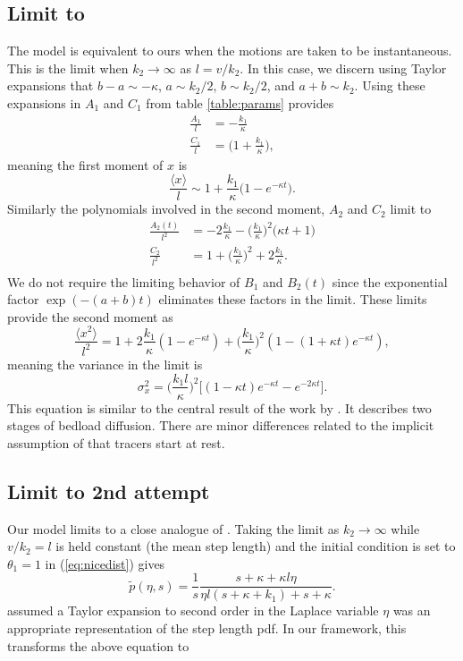 \documentclass[]{agujournal2018}
\newcommand\be{\begin{equation}}
\newcommand\ee{\end{equation}}
\newcommand\bra{\langle}
\newcommand\ket{\rangle}
\begin{document}
\subsection{Limit to \citet{Wu2019}}
The \citet{Wu2019} model is equivalent to ours when the motions are taken to be instantaneous. This is the limit when $k_2 \rightarrow \infty$ as $l=v/k_2$.
In this case, we discern using Taylor expansions that $b-a \sim -\kappa$, $ a \sim k_2/2$, $b\sim k_2/2$, and $a+b \sim k_2$.
Using these expansions in $A_1$ and $C_1$ from table \ref{table:params} provides
\begin{align}
\frac{A_1}{l} &= -\frac{k_1}{\kappa}\\
\frac{C_1}{l} &= \big(1+\frac{k_1}{\kappa}\big),
\end{align}
meaning the first moment of $x$ is 
\be \frac{\bra x \ket}{l} \sim 1 + \frac{k_1}{\kappa}\big(1-e^{-\kappa t}\big).\ee
Similarly the polynomials involved in the second moment, $A_2$ and $C_2$ limit to 
\begin{align}
\frac{A_2(t)}{l^2} &= -2\frac{k_1}{\kappa} - \Big(\frac{k_1}{\kappa}\Big)^2\big(\kappa t+ 1\big)\\
\frac{C_2}{l^2} &=1+ \Big(\frac{k_1}{\kappa}\Big)^2 + 2\frac{k_1}{\kappa}.\\
\end{align}
We do not require the limiting behavior of $B_1$ and $B_2(t)$ since the exponential factor $\exp(-(a+b)t)$ eliminates these factors in the limit.
These limits provide the second moment as 
\be \frac{\bra x^2 \ket}{l^2} = 1 + 2 \frac{k_1}{\kappa}(1-e^{-\kappa t}) + \Big(\frac{k_1}{\kappa}\Big)^2 (1-(1+\kappa t)e^{-\kappa t}),\ee
meaning the variance in the \citet{Wu2019} limit is 
\be \sigma_x^2 = \Big(\frac{k_1 l}{\kappa}\Big)^2 \Big[(1-\kappa t)e^{-\kappa t}-e^{-2\kappa t}\Big].\label{eq:wuvar}\ee
This equation is similar to the central result of the work by \citet{Wu2019}. It describes two stages of bedload diffusion.
There are minor differences related to the implicit assumption of \citet{Wu2019} that tracers start at rest.
\subsection{Limit to \citet{Wu2019} 2nd attempt}
Our model limits to a close analogue of \citet{Wu2019}.
Taking the limit as $k_2 \rightarrow \infty$ while $v/k_2 = l$ is held constant (the mean step length) and the initial condition is set to $\theta_1=1$ in (\ref{eq:nicedist}) gives
\be\tilde{p}(\eta,s) = \frac{1}{s}\frac{s+\kappa + \kappa l \eta }{\eta l (s + \kappa + k_1) + s + \kappa} .\ee
\citet{Wu2019} assumed a Taylor expansion to second order in the Laplace variable $\eta$ was an appropriate representation of the step length pdf.
In our framework, this transforms the above equation to 
\be \ee
\end{document}
